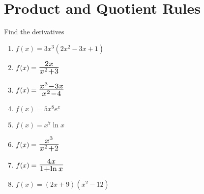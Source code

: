 \documentclass[14pt]{extarticle}
\newcommand*{\Scale}[2][1.5]{\scalebox{#1}{\ensuremath{#2}}}%
\begin{document}
\section{Product and Quotient Rules}
Find the derivatives
	\begin{enumerate}
		\item $f(x) = 3x^3(2x^2 - 3x+1)$
		\vspace{2.5cm}
		
		\item $f(x) = \Scale[1.5]{\frac{2x}{x^2+3}}$
		\vspace{2.5cm}
		
		\item $ f(x) = \Scale[1.5]{\frac{x^3-3x}{x^2-4}}$
		\vspace{3cm}
		
		\item $f(x) = 5x^8e^x$
		\vspace{2.5cm}
		
		\item $ f(x) = x^7\ln x$
		\vspace{2.5cm}
		
		\item $f(x) = \Scale[1.5]{\frac{x^3}{x^2+2}}$
		\vspace{2.5cm}
		
		\item $ f(x) = \Scale[1.5]{\frac{4x}{1+\ln x}}$	
		\vspace{2.5cm}	
		
		\item $ f(x) = (2x + 9)(x^2-12)$
		\vspace{2.5cm}
	\end{enumerate}
\end{document}
